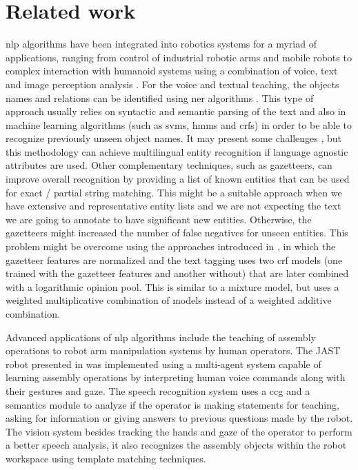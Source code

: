\section{Related work}\label{sec:related-work}

\gls{nlp} algorithms have been integrated into robotics systems for a myriad of applications, ranging from control of industrial robotic arms \cite{Akan2011,Watanabe2006} and mobile robots \cite{Matuszek2013} to complex interaction with humanoid systems using a combination of voice, text and image perception analysis \cite{Neo2008,Barabas2012}. For the voice and textual teaching, the objects names and relations can be identified using \gls{ner} algorithms \cite{Leon2014,Dlugolinsky2013}. This type of approach usually relies on syntactic and semantic parsing of the text and also in machine learning algorithms \cite{Ekbal2012} (such as \glspl{svm}, \glspl{hmm} and \glspl{crf}) in order to be able to recognize previously unseen object names. It may present some challenges \cite{Ratinov2009}, but this methodology can achieve multilingual entity recognition \cite{Rami2014} if language agnostic attributes are used. Other complementary techniques, such as gazetteers, can improve overall recognition by providing a list of known entities that can be used for exact / partial string matching. This might be a suitable approach when we have extensive and representative entity lists and we are not expecting the text we are going to annotate to have significant new entities. Otherwise, the gazetteers might increased the number of false negatives for unseen entities. This problem might be overcome using the approaches introduced in \cite{Smith2006}, in which the gazetteer features are normalized and the text tagging uses two \gls{crf} models (one trained with the gazetteer features and another without) that are later combined with a logarithmic opinion pool. This is similar to a mixture model, but uses a weighted multiplicative combination of models instead of a weighted additive combination.

Advanced applications of \gls{nlp} algorithms include the teaching of assembly operations to robot arm manipulation systems by human operators. The JAST robot presented in \cite{Rickert2007} was implemented using a multi-agent system capable of learning assembly operations by interpreting human voice commands along with their gestures and gaze. The speech recognition system uses a \gls{ccg} and a semantics module to analyze if the operator is making statements for teaching, asking for information or giving answers to previous questions made by the robot. The vision system besides tracking the hands and gaze of the operator to perform a better speech analysis, it also recognizes the assembly objects within the robot workspace using template matching techniques.

